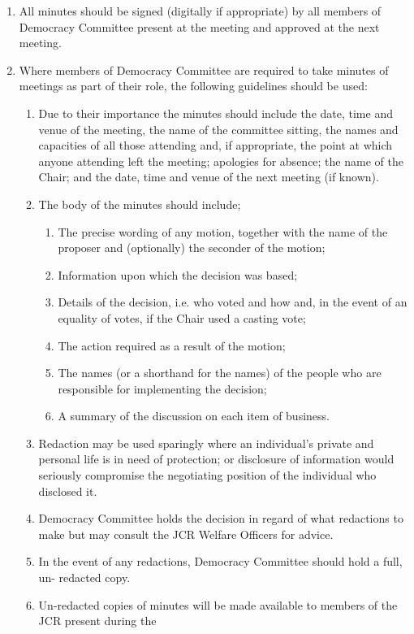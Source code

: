 \begin{enumerate}
\begin{enumerate}
        \item All minutes should be signed (digitally if appropriate) by all members of Democracy Committee present at the meeting and approved at the next meeting.
        \item Where members of Democracy Committee are required to take minutes of meetings as part of their role, the following guidelines should be used:
        \begin{enumerate}
            \item Due to their importance the minutes should include the date, time and venue of the meeting, the name of the committee sitting, the names and capacities of all those attending and, if appropriate, the point at which anyone attending left the meeting; apologies for absence; the name of the Chair; and the date, time and venue of the next meeting (if known).
            \item The body of the minutes should include;
            \begin{enumerate}
                \item  The precise wording of any motion, together with the name of the proposer
                and (optionally) the seconder of the motion;
                \item Information upon which the decision was based;
                \item Details of the decision, i.e. who voted and how and, in the event of an equality of votes, if the Chair used a casting vote;
                \item The action required as a result of the motion;
                \item The names (or a shorthand for the names) of the people who are responsible
                for implementing the decision;
                \item A summary of the discussion on each item of business.
            \end{enumerate}
            \item Redaction may be used sparingly where an individual’s private and personal life is in need of protection; or disclosure of information would seriously compromise the negotiating position of the individual who disclosed it.
            \item Democracy Committee holds the decision in regard of what redactions to make but may consult the JCR Welfare Officers for advice.
            \item In the event of any redactions, Democracy Committee should hold a full, un- redacted copy. \item Un-redacted copies of minutes will be made available to members of the JCR present during the

\end{enumerate}
\end{enumerate}
\end{enumerate}
